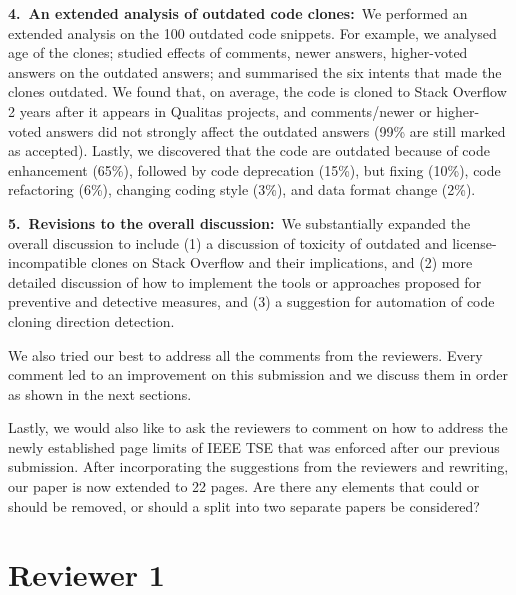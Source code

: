 \documentclass[a4paper,twoside,10pt]{reviewresponse}
\begin{document}
\textbf{4.~An extended analysis of outdated code clones:}~We performed an
extended analysis on the 100 outdated code snippets. For example, we analysed
age of the clones; studied effects of comments, newer answers, higher-voted
answers on the outdated answers; and summarised the six intents that made the
clones outdated. We found that, on average, the code is cloned to Stack Overflow
2 years after it appears in Qualitas projects, and comments/newer or
higher-voted answers did not strongly affect the outdated answers (99\% are
still marked as accepted). Lastly, we discovered that the code are outdated
because of code enhancement (65\%), followed by code deprecation (15\%), but
fixing (10\%), code refactoring (6\%), changing coding style (3\%), and data
format change (2\%).

\textbf{5.~Revisions to the overall discussion:}~We substantially expanded the
overall discussion to include (1) a discussion of toxicity of outdated and
license-incompatible clones on Stack Overflow and their implications, and (2)
more detailed discussion of how to implement the tools or approaches proposed
for preventive and detective measures, and (3) a suggestion for automation of
code cloning direction detection.

We also tried our best to address all the comments from the reviewers. Every
comment led to an improvement on this submission and we discuss them in order as
shown in the next sections.

Lastly, we would also like to ask the reviewers to comment on how to address the
newly established page limits of IEEE TSE that was enforced after our previous
submission. After incorporating the suggestions from the reviewers and
rewriting, our paper is now extended to 22 pages. Are there any elements that
could or should be removed, or should a split into two separate papers be
considered?

\clearpage

\section{Reviewer 1}
\end{document}
